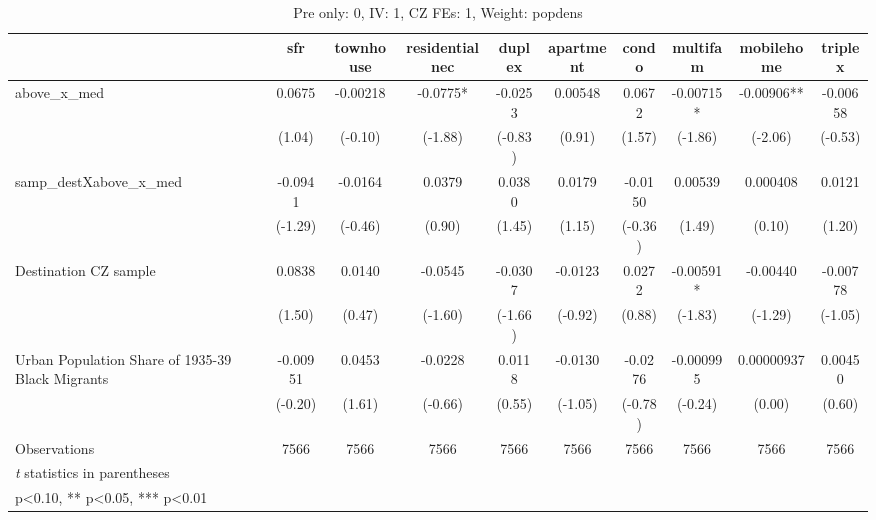 \begin{table}[htbp]\centering
\def\sym#1{\ifmmode^{#1}\else\(^{#1}\)\fi}
\caption{Pre only: 0, IV: 1, CZ FEs: 1, Weight: popdens}
\begin{tabular}{l*{9}{c}}
\toprule
                    &\multicolumn{1}{c}{sfr}&\multicolumn{1}{c}{townhouse}&\multicolumn{1}{c}{residentialnec}&\multicolumn{1}{c}{duplex}&\multicolumn{1}{c}{apartment}&\multicolumn{1}{c}{condo}&\multicolumn{1}{c}{multifam}&\multicolumn{1}{c}{mobilehome}&\multicolumn{1}{c}{triplex}\\
\midrule
above\_x\_med         &      0.0675   &    -0.00218   &     -0.0775*  &     -0.0253   &     0.00548   &      0.0672   &    -0.00715*  &    -0.00906** &    -0.00658   \\
                    &      (1.04)   &     (-0.10)   &     (-1.88)   &     (-0.83)   &      (0.91)   &      (1.57)   &     (-1.86)   &     (-2.06)   &     (-0.53)   \\
\addlinespace
samp\_destXabove\_x\_med&     -0.0941   &     -0.0164   &      0.0379   &      0.0380   &      0.0179   &     -0.0150   &     0.00539   &    0.000408   &      0.0121   \\
                    &     (-1.29)   &     (-0.46)   &      (0.90)   &      (1.45)   &      (1.15)   &     (-0.36)   &      (1.49)   &      (0.10)   &      (1.20)   \\
\addlinespace
Destination CZ sample&      0.0838   &      0.0140   &     -0.0545   &     -0.0307   &     -0.0123   &      0.0272   &    -0.00591*  &    -0.00440   &    -0.00778   \\
                    &      (1.50)   &      (0.47)   &     (-1.60)   &     (-1.66)   &     (-0.92)   &      (0.88)   &     (-1.83)   &     (-1.29)   &     (-1.05)   \\
\addlinespace
Urban Population Share of 1935-39 Black Migrants&    -0.00951   &      0.0453   &     -0.0228   &      0.0118   &     -0.0130   &     -0.0276   &   -0.000995   &  0.00000937   &     0.00450   \\
                    &     (-0.20)   &      (1.61)   &     (-0.66)   &      (0.55)   &     (-1.05)   &     (-0.78)   &     (-0.24)   &      (0.00)   &      (0.60)   \\
\midrule
Observations        &        7566   &        7566   &        7566   &        7566   &        7566   &        7566   &        7566   &        7566   &        7566   \\
\bottomrule
\multicolumn{10}{l}{\footnotesize \textit{t} statistics in parentheses}\\
\multicolumn{10}{l}{\footnotesize * p<0.10, ** p<0.05, *** p<0.01}\\
\end{tabular}
\end{table}
